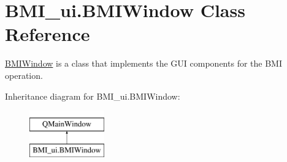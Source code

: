 \hypertarget{class_b_m_i__ui_1_1_b_m_i_window}{}\section{B\+M\+I\+\_\+ui.\+B\+M\+I\+Window Class Reference}
\label{class_b_m_i__ui_1_1_b_m_i_window}


\hyperlink{class_b_m_i__ui_1_1_b_m_i_window}{B\+M\+I\+Window} is a class that implements the G\+UI components for the B\+MI operation.  


Inheritance diagram for B\+M\+I\+\_\+ui.\+B\+M\+I\+Window\+:\begin{figure}[H]
\begin{center}
\leavevmode
\includegraphics[height=2.000000cm]{class_b_m_i__ui_1_1_b_m_i_window}
\end{center}
\end{figure}
